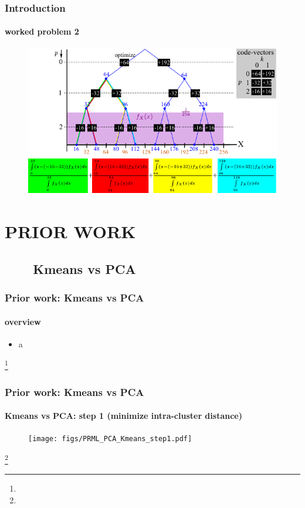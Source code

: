 \begin{frame}[plain]
\frametitle{Introduction}
\framesubtitle{worked problem 2}
\logoCSIPCPL\mypagenum
	\begin{changemargin}{-1.3in}{0in}
		\begin{figure}				
			\includegraphics[width=1.0\textwidth]{figs/RVQ_stagewise_example2.pdf}
			\label{fig:RVQ_SQ_DMSE}
		\end{figure}
	\end{changemargin}
\end{frame}



\section{PRIOR WORK}
\subsection{\ \ \ \ Kmeans vs PCA}
\begin{frame}
\frametitle{Prior work: Kmeans vs PCA}
\framesubtitle{overview}
\mypagenum
	\begin{itemize}
		\item a
	\end{itemize}
\footnote{\tiny {}}
\end{frame}




\begin{frame}[plain]
\frametitle{Prior work: Kmeans vs PCA}
\framesubtitle{Kmeans vs PCA: step 1 (minimize intra-cluster distance)}
\mypagenum
	\begin{changemargin}{-1.35in}{0in}
		\begin{figure}
			\texttt{[image: figs/PRML\_PCA\_Kmeans\_step1.pdf]}
		\end{figure}
	\end{changemargin}
\footnote{\tiny {}}
\end{frame}




